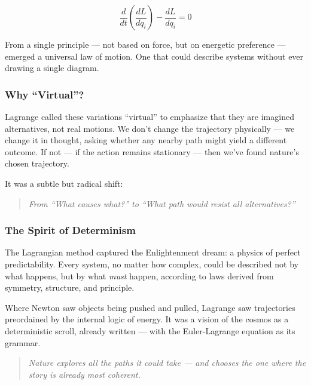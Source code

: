 \[
\frac{d}{dt} \left( \frac{dL}{d\dot{q}_i} \right) - \frac{dL}{dq_i} = 0
\]

From a single principle — not based on force, but on energetic preference — emerged a universal law of motion. One that could describe systems without ever drawing a single diagram.

\subsubsection{Why “Virtual”?}

Lagrange called these variations “virtual” to emphasize that they are imagined alternatives, not real motions. We don’t change the trajectory physically — we change it in thought, asking whether any nearby path might yield a different outcome. If not — if the action remains stationary — then we’ve found nature’s chosen trajectory.

It was a subtle but radical shift:
\begin{quote}
    \textit{From “What causes what?” to “What path would resist all alternatives?”}
\end{quote}

\subsubsection{The Spirit of Determinism}

The Lagrangian method captured the Enlightenment dream: a physics of perfect predictability. Every system, no matter how complex, could be described not by what happens, but by what \textit{must} happen, according to laws derived from symmetry, structure, and principle.

Where Newton saw objects being pushed and pulled, Lagrange saw trajectories preordained by the internal logic of energy. It was a vision of the cosmos as a deterministic scroll, already written — with the Euler-Lagrange equation as its grammar.

\begin{quote}
    \textit{Nature explores all the paths it could take — and chooses the one where the story is already most coherent.}
\end{quote}


